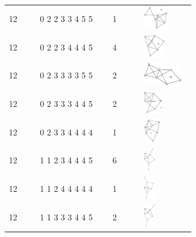 \begin{table}[h!]
\begin{tabular}{m{0.15\linewidth} m{0.35\linewidth} m{0.15\linewidth} m{0.25\linewidth}}
12 & 0 2 2 3 3 4 5 5 & 1 & \includegraphics[height=1cm]{15-universal-graphs/img/degree-sequences-example-graphs/graph-4-8-7}\\
12 & 0 2 2 3 4 4 4 5 & 4 & \includegraphics[height=1cm]{15-universal-graphs/img/degree-sequences-example-graphs/graph-4-8-8}\\
12 & 0 2 3 3 3 3 5 5 & 2 & \includegraphics[height=1cm]{15-universal-graphs/img/degree-sequences-example-graphs/graph-4-8-9}\\
12 & 0 2 3 3 3 4 4 5 & 2 & \includegraphics[height=1cm]{15-universal-graphs/img/degree-sequences-example-graphs/graph-4-8-10}\\
12 & 0 2 3 3 4 4 4 4 & 1 & \includegraphics[height=1cm]{15-universal-graphs/img/degree-sequences-example-graphs/graph-4-8-11}\\
12 & 1 1 2 3 4 4 4 5 & 6 & \includegraphics[height=1cm]{15-universal-graphs/img/degree-sequences-example-graphs/graph-4-8-12}\\
12 & 1 1 2 4 4 4 4 4 & 1 & \includegraphics[height=1cm]{15-universal-graphs/img/degree-sequences-example-graphs/graph-4-8-13}\\
12 & 1 1 3 3 3 4 4 5 & 2 & \includegraphics[height=1cm]{15-universal-graphs/img/degree-sequences-example-graphs/graph-4-8-14}\\

\end{tabular}
\end{table}
